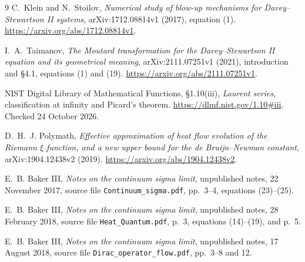 \documentclass[11pt]{article}
\theoremstyle{definition}
\theoremstyle{remark}
\begin{document}
\clearpage
\begin{thebibliography}{9}
C.~Klein and N.~Stoilov,
\emph{Numerical study of blow-up mechanisms for Davey--Stewartson II
systems}, arXiv:1712.08814v1 (2017), equation (1).
\url{https://arxiv.org/abs/1712.08814v1}.

I.~A.~Taimanov,
\emph{The Moutard transformation for the Davey--Stewartson II equation
and its geometrical meaning}, arXiv:2111.07251v1 (2021), introduction
and \S4.1, equations (1) and (19).
\url{https://arxiv.org/abs/2111.07251v1}.

NIST Digital Library of Mathematical Functions,
\S1.10(iii), \emph{Laurent series}, classification at infinity and
Picard's theorem. \url{https://dlmf.nist.gov/1.10#iii}.
Checked 24 October 2026.

D.~H.~J. Polymath,
\emph{Effective approximation of heat flow evolution of the Riemann
$\xi$ function, and a new upper bound for the de Bruijn--Newman constant},
arXiv:1904.12438v2 (2019).
\url{https://arxiv.org/abs/1904.12438v2}.

E.~B. Baker III, \emph{Notes on the continuum sigma limit},
unpublished notes, 22 November 2017, source file
\texttt{Continuum\_sigma.pdf}, pp.~3--4, equations (23)--(25).

E.~B. Baker III, \emph{Notes on the continuum sigma limit},
unpublished notes, 28 February 2018, source file
\texttt{Heat\_Quantum.pdf}, p.~3, equations (14)--(19), and p.~5.

E.~B. Baker III, \emph{Notes on the continuum sigma limit},
unpublished notes, 17 August 2018, source file
\texttt{Dirac\_operator\_flow.pdf}, pp.~3--8 and 12.
\end{thebibliography}
\end{document}
